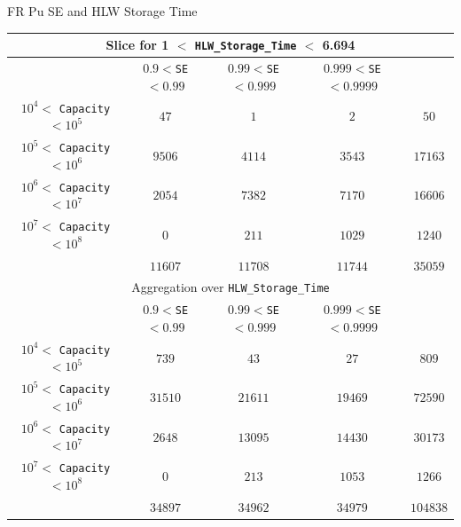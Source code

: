 \documentclass[pdf, autumn, slideColor, nocolorBG]{prosper}
\begin{document}
\begin{slide}{FR Pu SE and HLW Storage Time}
\begin{center}
\tiny
\begin{tabular}{|c||c|c|c||c|}
\hline
\multicolumn{5}{|c|}{Slice for 1 $<$ \texttt{HLW\_Storage\_Time} $<$ 6.694}\\
\hline
&$0.9<$\texttt{SE}$<0.99$&$0.99<$\texttt{SE}$<0.999$&$0.999<$\texttt{SE}$< 0.9999$&\\
\hline
$10^4 <$ \texttt{Capacity} $< 10^5$&$47$&$1$&$2$&$50$\\
\hline
$10^5 <$ \texttt{Capacity} $< 10^6$&$9506$&$4114$&$3543$&$17163$\\
\hline
$10^6 <$ \texttt{Capacity} $< 10^7$&$2054$&$7382$&$7170$&$16606$\\
\hline
$10^7 <$ \texttt{Capacity} $< 10^8$&$0$&$211$&$1029$&$1240$\\
\hline
&$11607$&$11708$&$11744$&$35059$\\
\hline
\hline
\multicolumn{5}{|c|}{Aggregation over \texttt{HLW\_Storage\_Time}}\\
\hline
&$0.9<$\texttt{SE}$<0.99$&$0.99<$\texttt{SE}$<0.999$&$0.999<$\texttt{SE}$< 0.9999$&\\
\hline
$10^4 <$ \texttt{Capacity} $< 10^5$&$739$&$43$&$27$&$809$\\
\hline
$10^5 <$ \texttt{Capacity} $< 10^6$&$31510$&$21611$&$19469$&$72590$\\
\hline
$10^6 <$ \texttt{Capacity} $< 10^7$&$2648$&$13095$&$14430$&$30173$\\
\hline
$10^7 <$ \texttt{Capacity} $< 10^8$&$0$&$213$&$1053$&$1266$\\
\hline
&$34897$&$34962$&$34979$&$104838$\\
\hline
\end{tabular}
\end{center}
\end{slide}
\end{document}

